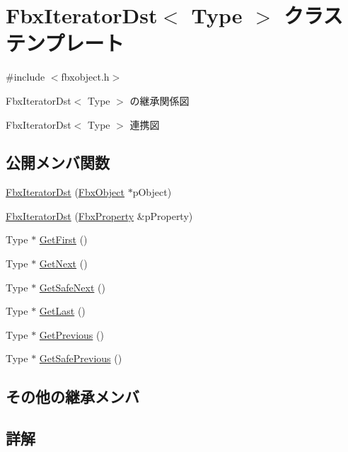 \hypertarget{class_fbx_iterator_dst}{}\section{Fbx\+Iterator\+Dst$<$ Type $>$ クラステンプレート}
\label{class_fbx_iterator_dst}


{\ttfamily \#include $<$fbxobject.\+h$>$}



Fbx\+Iterator\+Dst$<$ Type $>$ の継承関係図


Fbx\+Iterator\+Dst$<$ Type $>$ 連携図
\subsection*{公開メンバ関数}
\begin{DoxyCompactItemize}
\item 
\hyperlink{class_fbx_iterator_dst_a620226076a20ced72d2e4e3e902e447b}{Fbx\+Iterator\+Dst} (\hyperlink{class_fbx_object}{Fbx\+Object} $\ast$p\+Object)
\item 
\hyperlink{class_fbx_iterator_dst_a58a64aa620eda5b7a58aef5198484fde}{Fbx\+Iterator\+Dst} (\hyperlink{class_fbx_property}{Fbx\+Property} \&p\+Property)
\item 
Type $\ast$ \hyperlink{class_fbx_iterator_dst_a7e04f14a4ad50293c81ad1b35b4a206a}{Get\+First} ()
\item 
Type $\ast$ \hyperlink{class_fbx_iterator_dst_a576a29d2fed0e256026665daeae3eb03}{Get\+Next} ()
\item 
Type $\ast$ \hyperlink{class_fbx_iterator_dst_a0db8152df8a6c4be6b35e66b6d666b24}{Get\+Safe\+Next} ()
\item 
Type $\ast$ \hyperlink{class_fbx_iterator_dst_ac3fdecd61bbc92465c40cb45a6557473}{Get\+Last} ()
\item 
Type $\ast$ \hyperlink{class_fbx_iterator_dst_a6548b31d47373fcebc51541b190d133c}{Get\+Previous} ()
\item 
Type $\ast$ \hyperlink{class_fbx_iterator_dst_a8ccdc9811e9315aa7d5d30ff595615ef}{Get\+Safe\+Previous} ()
\end{DoxyCompactItemize}
\subsection*{その他の継承メンバ}


\subsection{詳解}
